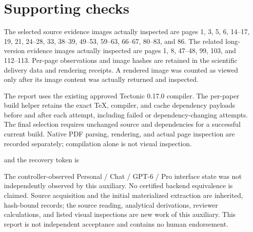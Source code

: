 \documentclass[10pt]{article}
\begin{document}
\section*{Supporting checks}
The selected source evidence images actually inspected are pages 1, 3, 5, 6, 14–17, 19, 21, 24–28, 33, 38–39, 49–53, 59–63, 66–67, 80–83, and 86. The related long-version evidence images actually inspected are pages 1, 8, 47–48, 99, 103, and 112–113. Per-page observations and image hashes are retained in the scientific delivery data and rendering receipts. A rendered image was counted as viewed only after its image content was actually returned and inspected.\par
The report uses the existing approved Tectonic 0.17.0 compiler. The per-paper build helper retains the exact TeX, compiler, and cache dependency payloads before and after each attempt, including failed or dependency-changing attempts. The final selection requires unchanged source and dependencies for a successful current build. Native PDF parsing, rendering, and actual page inspection are recorded separately; compilation alone is not visual inspection.\par
and the recovery token is\par
The controller-observed Personal / Chat / GPT-6 / Pro interface state was not independently observed by this auxiliary. No certified backend equivalence is claimed. Source acquisition and the initial materialized extraction are inherited, hash-bound records; the source reading, analytical derivations, reviewer calculations, and listed visual inspections are new work of this auxiliary. This report is not independent acceptance and contains no human endorsement.\par
\end{document}
